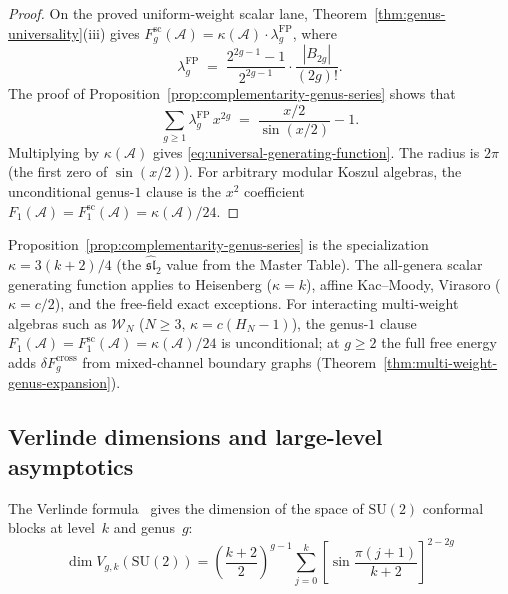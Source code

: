 \begin{proof}
On the proved uniform-weight scalar lane,
Theorem~\ref{thm:genus-universality}(iii) gives
$F_g^{\mathrm{sc}}(\mathcal{A}) =
\kappa(\mathcal{A}) \cdot \lambda_g^{\mathrm{FP}}$, where
\[
\lambda_g^{\mathrm{FP}}
\;=\;
\frac{2^{2g-1}-1}{2^{2g-1}} \cdot \frac{|B_{2g}|}{(2g)!}.
\]
The proof of Proposition~\ref{prop:complementarity-genus-series}
shows that
\[
\sum_{g \geq 1} \lambda_g^{\mathrm{FP}}\, x^{2g}
\;=\;
\frac{x/2}{\sin(x/2)} - 1.
\]
Multiplying by $\kappa(\mathcal{A})$ gives
\eqref{eq:universal-generating-function}. The radius is $2\pi$
(the first zero of $\sin(x/2)$). For arbitrary modular Koszul
algebras, the unconditional genus-$1$ clause is the $x^2$
coefficient
$F_1(\mathcal{A})=F_1^{\mathrm{sc}}(\mathcal{A})
= \kappa(\mathcal{A})/24$.
\end{proof}

\begin{remark}\label{rem:universal-generating-specializations}

Proposition~\ref{prop:complementarity-genus-series} is the
specialization $\kappa = 3(k+2)/4$ (the
$\widehat{\mathfrak{sl}}_2$ value from the Master Table).
The all-genera scalar generating function applies to Heisenberg
($\kappa = k$), affine Kac--Moody, Virasoro ($\kappa = c/2$),
and the free-field exact exceptions. For interacting multi-weight
algebras such as $\mathcal{W}_N$ ($N \geq 3$,
$\kappa = c(H_N - 1)$), the genus-$1$ clause
$F_1(\mathcal{A})=F_1^{\mathrm{sc}}(\mathcal{A})
=\kappa(\mathcal{A})/24$ is unconditional; at $g \geq 2$ the full
free energy adds $\delta F_g^{\mathrm{cross}}$ from mixed-channel
boundary graphs (Theorem~\ref{thm:multi-weight-genus-expansion}).
\end{remark}

\subsection{Verlinde dimensions and large-level asymptotics}\label{subsec:verlinde-connection}

The Verlinde formula~\cite{Verlinde} gives the dimension of the space of $\mathrm{SU}(2)$ conformal blocks at level~$k$ and genus~$g$:
\begin{equation}\label{eq:verlinde-su2}
\dim V_{g,k}(\mathrm{SU}(2)) = \left(\frac{k+2}{2}\right)^{g-1} \sum_{j=0}^{k} \left[\sin\frac{\pi(j+1)}{k+2}\right]^{2-2g}
\end{equation}

